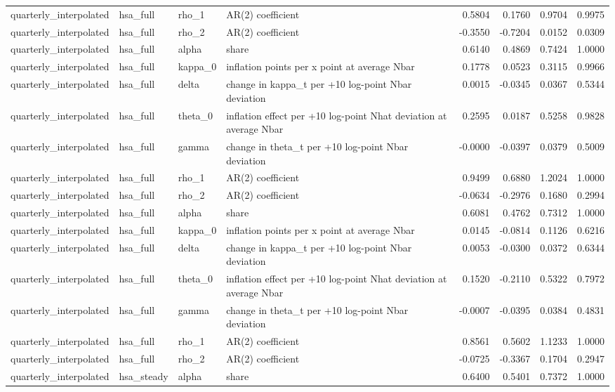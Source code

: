 \begin{tabular}{llllrrrr}
quarterly\_interpolated & hsa\_full & rho\_1 & AR(2) coefficient & 0.5804 & 0.1760 & 0.9704 & 0.9975 \\
quarterly\_interpolated & hsa\_full & rho\_2 & AR(2) coefficient & -0.3550 & -0.7204 & 0.0152 & 0.0309 \\
quarterly\_interpolated & hsa\_full & alpha & share & 0.6140 & 0.4869 & 0.7424 & 1.0000 \\
quarterly\_interpolated & hsa\_full & kappa\_0 & inflation points per x point at average Nbar & 0.1778 & 0.0523 & 0.3115 & 0.9966 \\
quarterly\_interpolated & hsa\_full & delta & change in kappa\_t per +10 log-point Nbar deviation & 0.0015 & -0.0345 & 0.0367 & 0.5344 \\
quarterly\_interpolated & hsa\_full & theta\_0 & inflation effect per +10 log-point Nhat deviation at average Nbar & 0.2595 & 0.0187 & 0.5258 & 0.9828 \\
quarterly\_interpolated & hsa\_full & gamma & change in theta\_t per +10 log-point Nbar deviation & -0.0000 & -0.0397 & 0.0379 & 0.5009 \\
quarterly\_interpolated & hsa\_full & rho\_1 & AR(2) coefficient & 0.9499 & 0.6880 & 1.2024 & 1.0000 \\
quarterly\_interpolated & hsa\_full & rho\_2 & AR(2) coefficient & -0.0634 & -0.2976 & 0.1680 & 0.2994 \\
quarterly\_interpolated & hsa\_full & alpha & share & 0.6081 & 0.4762 & 0.7312 & 1.0000 \\
quarterly\_interpolated & hsa\_full & kappa\_0 & inflation points per x point at average Nbar & 0.0145 & -0.0814 & 0.1126 & 0.6216 \\
quarterly\_interpolated & hsa\_full & delta & change in kappa\_t per +10 log-point Nbar deviation & 0.0053 & -0.0300 & 0.0372 & 0.6344 \\
quarterly\_interpolated & hsa\_full & theta\_0 & inflation effect per +10 log-point Nhat deviation at average Nbar & 0.1520 & -0.2110 & 0.5322 & 0.7972 \\
quarterly\_interpolated & hsa\_full & gamma & change in theta\_t per +10 log-point Nbar deviation & -0.0007 & -0.0395 & 0.0384 & 0.4831 \\
quarterly\_interpolated & hsa\_full & rho\_1 & AR(2) coefficient & 0.8561 & 0.5602 & 1.1233 & 1.0000 \\
quarterly\_interpolated & hsa\_full & rho\_2 & AR(2) coefficient & -0.0725 & -0.3367 & 0.1704 & 0.2947 \\
quarterly\_interpolated & hsa\_steady & alpha & share & 0.6400 & 0.5401 & 0.7372 & 1.0000 \\

\end{tabular}
